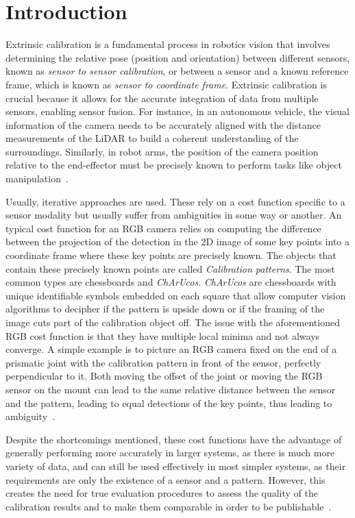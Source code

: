 \section{Introduction}
\label{sec:introduction}

Extrinsic calibration is a fundamental process in robotics vision that involves determining the
relative pose (position and orientation) between different sensors, known as \textit{sensor to sensor calibration}, or between a sensor and a known reference
frame, which is known as \textit{sensor to coordinate frame}. Extrinsic calibration is crucial because it allows for the accurate integration of data from multiple sensors,
enabling sensor fusion. For instance, in an autonomous vehicle, the visual information of the camera
needs to be accurately aligned with the distance measurements of the LiDAR to build a coherent understanding of the
surroundings. Similarly, in robot arms, the position of the camera position relative to the end-effector must be precisely
known to perform tasks like object manipulation~\cite{atom}. 

Usually, iterative approaches are used. These rely on a cost function specific to a sensor modality but usually suffer from ambiguities
in some way or another. An typical cost function for an RGB camera relies on computing the difference between the projection of the
detection in the 2D image of some key points into a coordinate frame where these key points are precisely known. The objects that
contain these precisely known points are called \textit{Calibration patterns}. The most common types are chessboards and \textit{ChArUcos}.
\textit{ChArUcos} are chessboards with unique identifiable symbols embedded on each square that allow computer vision algorithms to decipher if the
pattern is upside down or if the framing of the image cuts part of the calibration object off. The issue with the aforementioned RGB cost function is that they
have multiple local minima and not always converge. A simple example is to picture an RGB camera fixed on the end of a prismatic joint
with the calibration pattern in front of the sensor, perfectly perpendicular to it. Both moving the offset of the joint or
moving the RGB sensor on the mount can lead to the same relative distance between the sensor and
the pattern, leading to equal detections of the key points, thus leading to
ambiguity~\cite{atom}. 

Despite the shortcomings mentioned, these cost functions have the advantage of generally performing more accurately in larger systems,
as there is much more variety of data, and can still be used effectively in most simpler systems, as their requirements are only the
existence of a sensor and a pattern. However, this creates the need for true evaluation procedures to assess the quality of the
calibration results and to make them comparable in order to be publishable~\cite{atom}. 

